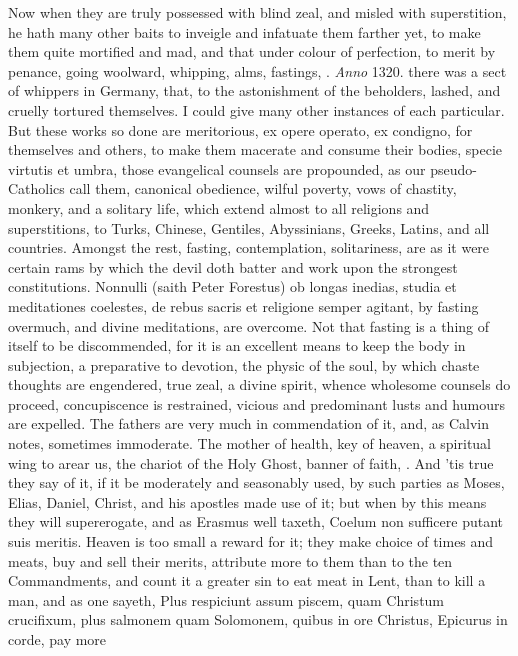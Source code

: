 {Now when they are truly possessed with blind zeal, and misled with
superstition, he hath many other baits to inveigle and infatuate them
farther yet, to make them quite mortified and mad, and that under
colour of perfection, to merit by penance, going woolward, whipping,
alms, fastings, \etc{}. \emph{Anno} 1320. there was a sect of whippers in
Germany, that, to the astonishment of the beholders, lashed, and
cruelly tortured themselves. I could give many other instances of each
particular. But these works so done are meritorious, ex opere operato,
ex condigno, for themselves and others, to make them macerate and
consume their bodies, specie virtutis et umbra, those evangelical
counsels are propounded, as our pseudo-Catholics call them, canonical
obedience, wilful poverty, vows of chastity, monkery, and a
solitary life, which extend almost to all religions and superstitions,
to Turks, Chinese, Gentiles, Abyssinians, Greeks, Latins, and all
countries. Amongst the rest, fasting, contemplation, solitariness, are
as it were certain rams by which the devil doth batter and work upon
the strongest constitutions. Nonnulli (saith Peter Forestus) ob longas
inedias, studia et meditationes coelestes, de rebus sacris et religione
semper agitant, by fasting overmuch, and divine meditations, are
overcome. Not that fasting is a thing of itself to be discommended, for
it is an excellent means to keep the body in subjection, a preparative
to devotion, the physic of the soul, by which chaste thoughts are
engendered, true zeal, a divine spirit, whence wholesome counsels do
proceed, concupiscence is restrained, vicious and predominant lusts and
humours are expelled. The fathers are very much in commendation of it,
and, as Calvin notes, sometimes immoderate. The mother of health,
key of heaven, a spiritual wing to arear us, the chariot of the Holy
Ghost, banner of faith, \etc{}. And 'tis true they say of it, if it be
moderately and seasonably used, by such parties as Moses, Elias,
Daniel, Christ, and his apostles made use of it; but when by this
means they will supererogate, and as Erasmus well taxeth, Coelum
non sufficere putant suis meritis. Heaven is too small a reward for it;
they make choice of times and meats, buy and sell their merits,
attribute more to them than to the ten Commandments, and count it a
greater sin to eat meat in Lent, than to kill a man, and as one sayeth,
Plus respiciunt assum piscem, quam Christum crucifixum, plus salmonem
quam Solomonem, quibus in ore Christus, Epicurus in corde, pay more
}
